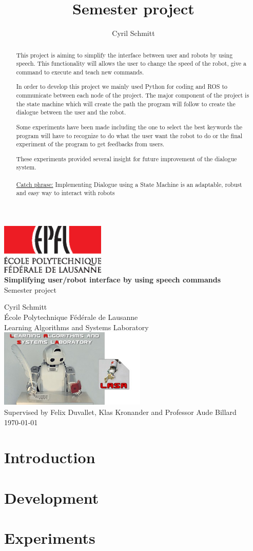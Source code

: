 \documentclass[12pt,a4paper]{article}
\title{Semester project}
\author{Cyril Schmitt}
\newcommand\blankpage{
    \null
    \thispagestyle{empty}
    \newpage}
\renewcommand{\maketitle}{
\begin{titlepage}
\centering
\includegraphics[width=5cm]{img/EPFL_LOGO.eps}\\
\vspace*{3cm}
\LARGE{\textbf{Simplifying user/robot interface by  \linebreak using speech commands
\\}}
Semester project

\vspace*{2cm}
\Large{Cyril Schmitt} \\
\vspace*{2cm}
\normalsize{\'{E}cole Polytechnique F\'{e}d\'{e}rale de Lausanne\\Learning Algorithms and Systems Laboratory\\}
\vspace*{1cm}
\includegraphics[width=7cm]{img/lasa-logo.jpeg}\\
\vspace*{2cm}
\large{Supervised by Felix Duvallet, Klas Kronander and Professor Aude Billard\\}
\vspace*{1cm}
\today
\end{titlepage}
}
\begin{document}
\maketitle
\thispagestyle{plain}

\blankpage

\begin{abstract}
This project is aiming to simplify the interface between user and robots by using speech. This functionality will allows the user to change the speed of the robot, give a command to execute and teach new commands.

In order to develop this project we mainly used Python for coding and ROS to communicate between each node of the project. The major component of the project is the state machine which will create the path the program will follow to create the dialogue between the user and the robot.

Some experiments have been made including the one to select the best keywords the program will have to recognize to do what the user want the robot to do or the final experiment of the program to get feedbacks from users.

These experiments provided several insight for future improvement of the dialogue system.\\
\\
\underline{Catch phrase:} Implementing Dialogue using a State Machine is an adaptable, robust and easy way to interact with robots

\end{abstract}
\clearpage

\newpage
\thispagestyle{empty}
\begin{tableofcontents}
\end{tableofcontents}


\clearpage
\section{Introduction}

\clearpage
\section{Development}

\clearpage
\section{Experiments}

\clearpage
\end{document}
